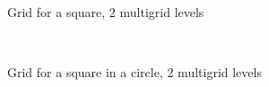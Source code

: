 
\begin{figure}[h] \begin{center}
\  \end{center}
 \caption{Grid for a square, 2 multigrid levels}
 \label{sq20}
\end{figure}


\begin{figure}[h] \begin{center}
\  \end{center}
 \caption{Grid for a square in a circle, 2 multigrid levels}
 \label{sic2mg}
\end{figure}
